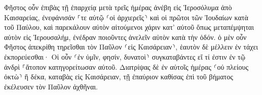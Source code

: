 \documentclass{openreader}
\begin{document}

Φῆστος οὖν ἐπιβὰς τῇ ἐπαρχείᾳ μετὰ τρεῖς ἡμέρας ἀνέβη εἰς Ἱεροσόλυμα ἀπὸ Καισαρείας, 
ἐνεφάνισάν ⸀τε αὐτῷ ⸂οἱ ἀρχιερεῖς⸃ καὶ οἱ πρῶτοι τῶν Ἰουδαίων κατὰ τοῦ Παύλου, καὶ παρεκάλουν αὐτὸν 
αἰτούμενοι χάριν κατ’ αὐτοῦ ὅπως μεταπέμψηται αὐτὸν εἰς Ἰερουσαλήμ, ἐνέδραν ποιοῦντες ἀνελεῖν αὐτὸν κατὰ τὴν ὁδόν. 
ὁ μὲν οὖν Φῆστος ἀπεκρίθη τηρεῖσθαι τὸν Παῦλον ⸂εἰς Καισάρειαν⸃, ἑαυτὸν δὲ μέλλειν ἐν τάχει ἐκπορεύεσθαι· 
Οἱ οὖν ⸂ἐν ὑμῖν, φησίν, δυνατοὶ⸃ συγκαταβάντες εἴ τί ἐστιν ἐν τῷ ἀνδρὶ ⸀ἄτοπον κατηγορείτωσαν αὐτοῦ. 
Διατρίψας δὲ ἐν αὐτοῖς ἡμέρας ⸂οὐ πλείους ὀκτὼ⸃ ἢ δέκα, καταβὰς εἰς Καισάρειαν, τῇ ἐπαύριον καθίσας ἐπὶ τοῦ βήματος ἐκέλευσεν τὸν Παῦλον ἀχθῆναι. 
\end{document}
